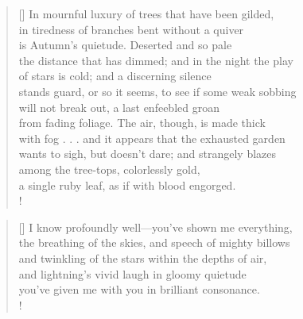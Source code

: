 \documentclass[]{article}
\newcommand{\poemauthorcenter}[1]{\nopagebreak{\centering\footnotesize\textsc{#1}\par}}
\begin{document}
\settowidth{\versewidth}{In mournful luxury of trees that have been gilded}
\begin{verse}[\versewidth]
In mournful luxury of trees that have been gilded,\\
in tiredness of branches bent without a quiver\\
is Autumn's quietude. Deserted and so pale\\
the distance that has dimmed; and in the night the play\\
of stars is cold; and a discerning silence\\
stands guard, or so it seems, to see if some weak sobbing\\
will not break out, a last enfeebled groan\\
from fading foliage. The air, though, is made thick\\
with fog . . . and it appears that the exhausted garden\\
wants to sigh, but doesn't dare; and strangely blazes\\
among the tree-tops, colorlessly gold,\\
a single ruby leaf, as if with blood engorged.\\!
\end{verse}
\newpage 

\settowidth{\versewidth}{I know profoundly well—you've shown me everything}
\begin{verse}[\versewidth]
I know profoundly well—you've shown me everything,\\
the breathing of the skies, and speech of mighty billows\\
and twinkling of the stars within the depths of air,\\
and lightning's vivid laugh in gloomy quietude\\
you've given me with you in brilliant consonance.\\! 
\end{verse}
\poemauthorcenter{\textit{1905- 1906}}
\bigskip
\end{document}

